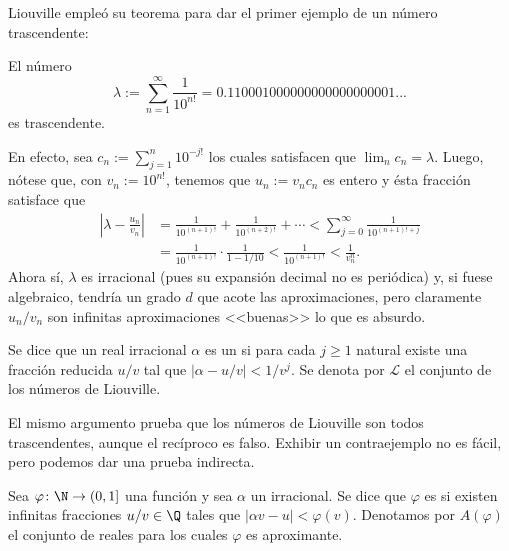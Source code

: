 \documentclass[teoria-numeros.tex]{subfiles}
\begin{document}
Liouville empleó su teorema para dar el primer ejemplo de un número trascendente:
\begin{exn}\label{ex:liouville_number}
	El número
	$$ \lambda := \sum_{n=1}^{\infty} \frac{1}{10^{n!}} = 0.110001 00000 00000 00000 001... $$
	es trascendente.

	En efecto, sea $c_n := \sum_{j=1}^{n} 10^{-j!}$ los cuales satisfacen que $\lim_n c_n = \lambda$.
	Luego, nótese que, con $v_n := 10^{n!}$, tenemos que $u_n := v_nc_n$ es entero y ésta fracción satisface que
	\begin{align*}
		\left| \lambda - \frac{u_n}{v_n} \right| &= \frac{1}{10^{(n+1)!}} + \frac{1}{10^{(n+2)!}} + \cdots < \sum_{j=0}^{\infty} \frac{1}{10^{(n+1)! + j}} \\
							 &= \frac{1}{10^{(n+1)!}} \cdot \frac{1}{1 - 1/10} < \frac{1}{10^{(n+1)!}} < \frac{1}{v_n^n}.
	\end{align*}
	Ahora sí, $\lambda$ es irracional (pues su expansión decimal no es periódica) y, si fuese algebraico, tendría un grado $d$ que acote las
	aproximaciones, pero claramente $u_n/v_n$ son infinitas aproximaciones <<buenas>> lo que es absurdo.
\end{exn}
\begin{mydef}
	Se dice que un real irracional $\alpha$ es un  si para cada $j \ge 1$ natural
	existe una fracción reducida $u/v$ tal que $|\alpha - u/v| < 1/v^j$.
	Se denota por $\mathcal{L}$ el conjunto de los números de Liouville.
\end{mydef}

El mismo argumento prueba que los números de Liouville son todos trascendentes, aunque el recíproco es falso.
Exhibir un contraejemplo no es fácil, pero podemos dar una prueba indirecta.

\begin{mydef}
	Sea $\varphi \colon \N \to (0, 1]$ una función y sea $\alpha$ un irracional.
	Se dice que $\varphi$ es  si existen infinitas fracciones $u/v \in \Q$
	tales que $|\alpha v - u| < \varphi(v)$.
	Denotamos por $A(\varphi)$ el conjunto de reales para los cuales $\varphi$ es aproximante.
\end{mydef}
\end{document}
